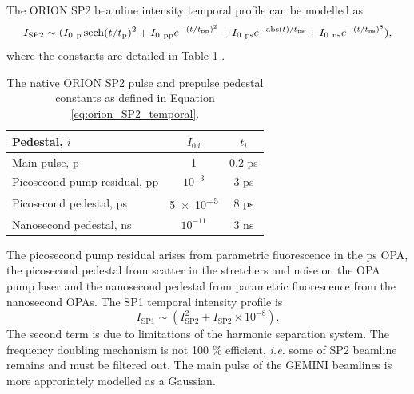 The ORION SP2 beamline intensity temporal profile can be modelled as
\begin{equation}\label{eq:orion_SP2_temporal}
	I_\mathrm{SP2} \sim (I_{0 \ \mathrm{p}}\sech(t/t_\mathrm{p})^2 + I_{0 \ \mathrm{pp}}e^{-(t/t_\mathrm{pp})^2} + I_{0 \ \mathrm{ps}}e^{-\mathrm{abs}(t)/t_\mathrm{ps}} + I_{0 \ \mathrm{ns}}e^{-(t/t_\mathrm{ns})^8}),
\end{equation}
where the constants are detailed in Table \ref{tab:orion_pedestals} \cite{dhillierModelORIONContrast2022}.
\begin{table}[]
	\centering
	\begin{tabular}{lcc}
		\hline\hline
		Pedestal, $i$                & $I_{0 \ i}$ & $t_i$  \\ \hline
		Main pulse, p                & 1           & 0.2 ps \\
		Picosecond pump residual, pp & $10^{-3}$   & 3 ps   \\
		Picosecond pedestal, ps      & \num{5e-5}  & 8 ps   \\
		Nanosecond pedestal, ns      & $10^{-11}$  & 3 ns  \\ \hline \hline
	\end{tabular}
	\caption{The native ORION SP2 pulse and prepulse pedestal constants as defined in Equation \ref{eq:orion_SP2_temporal}.}
	\label{tab:orion_pedestals}
\end{table}
The picosecond pump residual arises from parametric fluorescence in the ps OPA, the picosecond pedestal from scatter in the stretchers and noise on the OPA pump laser and the nanosecond pedestal from parametric fluorescence from the nanosecond OPAs. 
The SP1 temporal intensity profile is
\begin{equation}
	I_\mathrm{SP1} \sim (I_\mathrm{SP2}^2 + I_\mathrm{SP2} \times 10^{-8}).
\end{equation}
The second term is due to limitations of the harmonic separation system. The frequency doubling mechanism is not 100 \% efficient, \textit{i.e.} some of SP2 beamline remains and must be filtered out. The main pulse of the GEMINI beamlines is more approriately modelled as a Gaussian.


